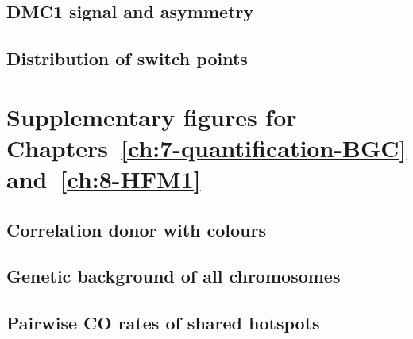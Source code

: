 \subsection{DMC1 signal and asymmetry}
\subsection{Distribution of switch points}

\hypersetup{linkcolor=titlepagecolorsection}
\section{Supplementary figures for Chapters~\ref{ch:7-quantification-BGC} and~\ref{ch:8-HFM1}}
\hypersetup{linkcolor=black}

\subsection{Correlation donor with colours}
\subsection{Genetic background of all chromosomes}
\subsection{Pairwise CO rates of shared hotspots}






